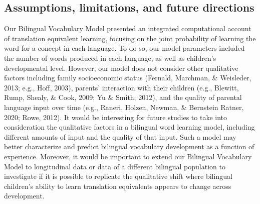 \documentclass[
  english,
  ,man,floatsintext]{apa6}
\begin{document}
\hypertarget{assumptions-limitations-and-future-directions}{%
\subsection{Assumptions, limitations, and future directions}\label{assumptions-limitations-and-future-directions}}

Our Bilingual Vocabulary Model presented an integrated computational account of translation equivalent learning, focusing on the joint probability of learning the word for a concept in each language. To do so, our model parameters included the number of words produced in each language, as well as children's developmental level. However, our model does not consider other qualitative factors including family socioeconomic status (Fernald, Marchman, \& Weisleder, 2013; e.g., Hoff, 2003), parents' interaction with their children (e.g., Blewitt, Rump, Shealy, \& Cook, 2009; Yu \& Smith, 2012), and the quality of parental language input over time (e.g., Raneri, Holzen, Newman, \& Bernstein Ratner, 2020; Rowe, 2012). It would be interesting for future studies to take into consideration the qualitative factors in a bilingual word learning model, including different amounts of input and the quality of that input. Such a model may better characterize and predict bilingual vocabulary development as a function of experience. Moreover, it would be important to extend our Bilingual Vocabulary Model to longitudinal data or data of a different bilingual population to investigate if it is possible to replicate the qualitative shift where bilingual children's ability to learn translation equivalents appears to change across development.
\end{document}
